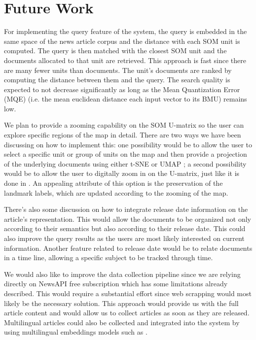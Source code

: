 \documentclass[a4paper]{article}
\begin{document}
\section*{Future Work}
For implementing the query feature of the system, the query is embedded in the same space of the news article corpus and the distance with each SOM unit is computed. The query is then matched with the closest SOM unit and the documents allocated to that unit are retrieved. This approach is fast since there are many fewer units than documents. The unit's documents are ranked by computing the distance between them and the query. The search quality is expected to not decrease significantly as long as the Mean Quantization Error (MQE) (i.e. the mean euclidean distance each input vector to its BMU) remains low.

We plan to provide a zooming capability on the SOM U-matrix so the user can explore specific regions of the map in detail. There are two ways we have been discussing on how to implement this: one possibility would be to allow the user to select a specific unit or group of units on the map and then provide a projection of the underlying documents using either t-SNE \citep{vandermaaten2008} or UMAP \citep{mcinnes2020}; a second possibility would be to allow the user to digitally zoom in on the U-matrix, just like it is done in \citet{kaski1998}. An appealing attribute of this option is the preservation of the landmark labels, which are updated according to the zooming of the map.

There's also some discussion on how to integrate release date information on the article's representation. This would allow the documents to be organized not only according to their semantics but also according to their release date. This could also improve the query results as the users are most likely interested on current information. Another feature related to release date would be to relate documents in a time line, allowing a specific subject to be tracked through time. 

We would also like to improve the data collection pipeline since we are relying directly on NewsAPI free subscription which has some limitations already described. This would require a substantial effort since web scrapping would most likely be the necessary solution. This approach would provide us with the full article content and would allow us to collect articles as soon as they are released. Multilingual articles could also be collected and integrated into the system by using multilingual embeddings models such as \citet{conneau2019}.
\end{document}
